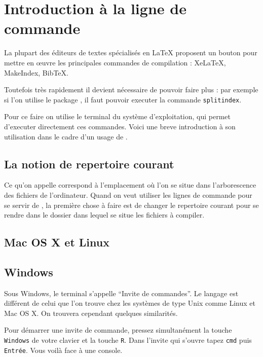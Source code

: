 \section{Introduction à la ligne de commande}\label{lignedecommande}

\begin{preliminaire}
La plupart des éditeurs de textes spécialisés en LaTeX  proposent un bouton pour mettre en œuvre les principales commandes de compilation :  XeLaTeX, MakeIndex, BibTeX.

Toutefois très rapidement il devient nécessaire de pouvoir faire plus : par exemple si l’on utilise le package , il faut pouvoir  executer la commande \verb|splitindex|.

Pour ce faire on utilise le terminal du système d'exploitation, qui permet d'executer directement ces commandes. Voici une breve introduction à son utilisation dans le cadre d'un usage de \XeLaTeX.
\end{preliminaire}

\subsection{La notion de repertoire courant}

Ce qu'on appelle  correspond à l'emplacement où l'on se situe dans l'arborescence des fichiers de l'ordinateur. Quand on veut utiliser les lignes de commande pour se servir de \XeLaTeX, la première chose à faire est de changer le repertoire courant pour se rendre dans le dossier dans lequel se situe les fichiers à compiler.
\subsection{Mac OS X et Linux}


\subsection{Windows}
Sous Windows, le terminal s'appelle \enquote{Invite de commandes}. Le langage
est différent de celui que l'on trouve chez les systèmes de type Unix comme
Linux et Mac OS X. On trouvera cependant quelques similarités.

Pour démarrer une invite de commande, pressez simultanément la touche \verb|Windows| de votre
clavier et la touche \verb|R|. Dans l'invite qui s'ouvre tapez \verb|cmd| puis
\verb|Entrée|. Vous voilà face à une console.

